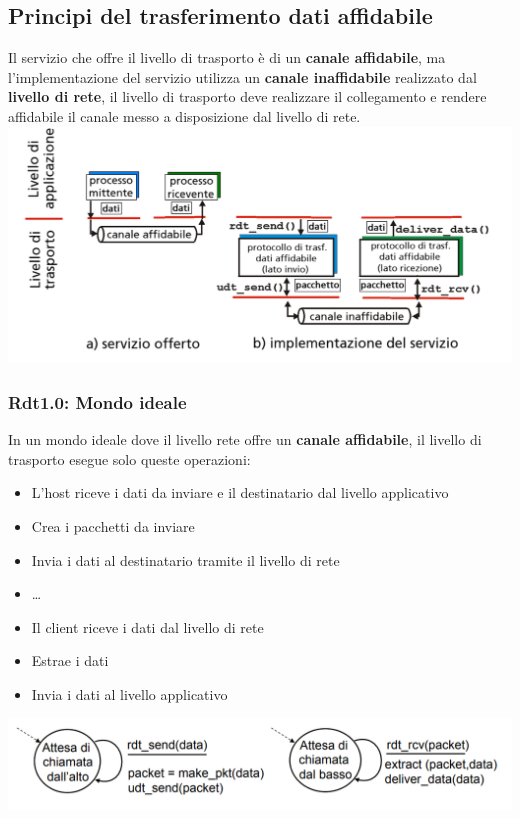 \subsection{Principi del trasferimento dati affidabile}
Il servizio che offre il livello di trasporto è di un \textbf{canale affidabile}, ma l'implementazione del servizio utilizza un \textbf{canale inaffidabile} realizzato dal \textbf{livello di rete}, il livello di trasporto deve realizzare il collegamento e rendere affidabile il canale messo a disposizione dal livello di rete. \\
\includegraphics[width=\textwidth]{./img/implemntazionelivellotrasporto.png} \\

\subsubsection*{Rdt1.0: Mondo ideale}
In un mondo ideale dove il livello rete offre un \textbf{canale affidabile}, il livello di trasporto esegue solo queste operazioni:
\begin{itemize}
  \item L'host riceve i dati da inviare e il destinatario dal livello applicativo
  \item Crea i pacchetti da inviare
  \item Invia i dati al destinatario tramite il livello di rete
  \item \dots
  \item Il client riceve i dati dal livello di rete
  \item Estrae i dati 
  \item Invia i dati al livello applicativo
\end{itemize}

\includegraphics[width=\textwidth]{./img/rdt1.0.png} \\

